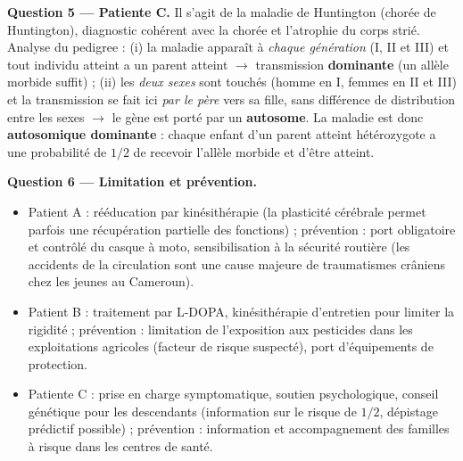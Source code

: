 \documentclass[11pt]{article}
\newcommand{\cle}[1]{{\popxbold\color{popdark}#1}}
\begin{document}
\begin{exoresolu}
\textbf{Question 5 — Patiente C.} Il s'agit de la \cle{maladie de Huntington} (chorée de Huntington), diagnostic cohérent avec la chorée et l'atrophie du corps strié. Analyse du pedigree : (i) la maladie apparaît à \emph{chaque génération} (I, II et III) et tout individu atteint a un parent atteint $\rightarrow$ transmission \textbf{dominante} (un allèle morbide suffit) ; (ii) les \emph{deux sexes} sont touchés (homme en I, femmes en II et III) et la transmission se fait ici \emph{par le père} vers sa fille, sans différence de distribution entre les sexes $\rightarrow$ le gène est porté par un \textbf{autosome}. La maladie est donc \textbf{autosomique dominante} : chaque enfant d'un parent atteint hétérozygote a une probabilité de $1/2$ de recevoir l'allèle morbide et d'être atteint.

\textbf{Question 6 — Limitation et prévention.}
\begin{itemize}
\item Patient A : rééducation par kinésithérapie (la plasticité cérébrale permet parfois une récupération partielle des fonctions) ; prévention : port obligatoire et contrôlé du casque à moto, sensibilisation à la sécurité routière (les accidents de la circulation sont une cause majeure de traumatismes crâniens chez les jeunes au Cameroun).
\item Patient B : traitement par L-DOPA, kinésithérapie d'entretien pour limiter la rigidité ; prévention : limitation de l'exposition aux pesticides dans les exploitations agricoles (facteur de risque suspecté), port d'équipements de protection.
\item Patiente C : prise en charge symptomatique, soutien psychologique, conseil génétique pour les descendants (information sur le risque de $1/2$, dépistage prédictif possible) ; prévention : information et accompagnement des familles à risque dans les centres de santé.
\end{itemize}
\end{exoresolu}
\end{document}
